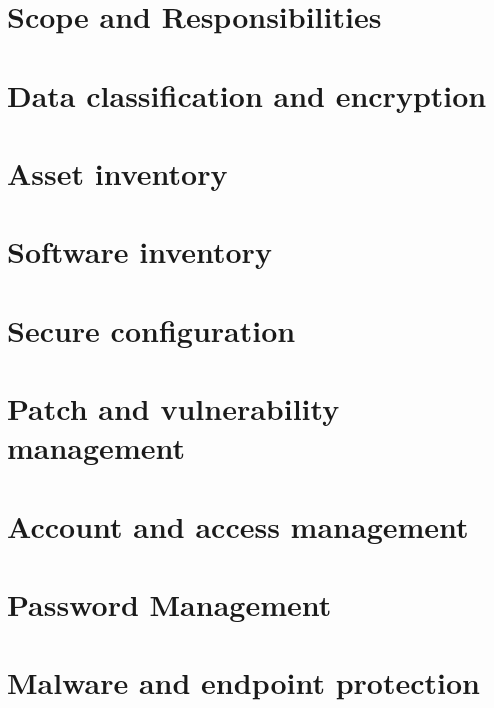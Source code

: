 
\section{Scope and Responsibilities}


\section{Data classification and encryption}


\section{Asset inventory}


\section{Software inventory}


\section{Secure configuration}


\section{Patch and vulnerability management}


\section{Account and access management}


\section{Password Management}


\section{Malware and endpoint protection}


